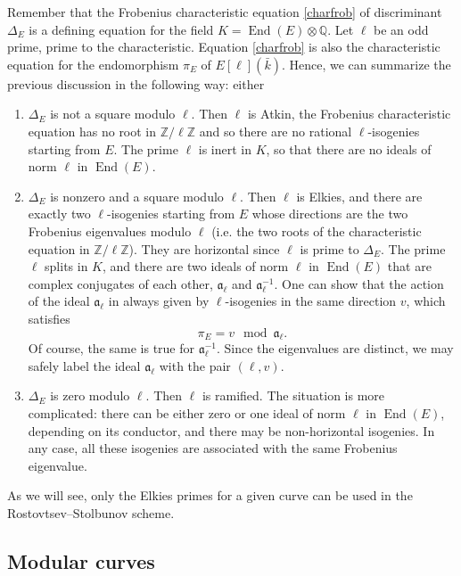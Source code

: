 \documentclass{article}
\newcommand{\Q}{\mathbb{Q}}
\newcommand{\Z}{\mathbb{Z}}
\renewcommand{\frak}{\mathfrak}
\theoremstyle{definition}
\DeclareMathOperator{\End}{End}
\begin{document}
Remember that the Frobenius characteristic equation \eqref{charfrob}
of discriminant $\Delta_E$ is a defining equation for the field $K = \End(E)
\otimes\Q$. 
Let $\ell$ be an odd prime, prime to the characteristic.
Equation \eqref{charfrob} is also the characteristic
equation for the endomorphism $\pi_E$ of $E[\ell](\bar{k})$.
Hence, we can summarize the previous discussion 
in the following way: either
\begin{enumerate}
\item $\Delta_E$ is not a square modulo $\ell$. Then $\ell$ is Atkin, the Frobenius
characteristic equation has no root in $\Z/\ell\Z$ and so there 
are no rational $\ell$-isogenies starting from $E$. The prime $\ell$ is inert 
in $K$, so that there are no ideals of norm $\ell$ in $\End(E)$.
\item $\Delta_E$ is nonzero and a square modulo $\ell$. Then $\ell$ is Elkies, 
and there are exactly two $\ell$-isogenies starting from $E$ whose directions 
are the two Frobenius eigenvalues modulo $\ell$ (i.e. the two roots of the
characteristic equation in $\Z/\ell\Z$). They are horizontal since $\ell
$ is prime to $\Delta_E$. The prime $\ell$ splits in $K$, and there are two 
ideals of norm $\ell$ in $\End(E)$ that are complex conjugates of each other, $
\frak a_\ell$ and $\frak a_\ell^{-1}$. One can show that the action of the 
ideal $\frak a_\ell$ in always given by $\ell$-isogenies in the same direction $
v$, which satisfies
\[
\pi_E = v \mod \frak a_\ell.
\]
Of course, the same is true for $\frak a_\ell^{-1}$. Since the eigenvalues are 
distinct, we may safely label the ideal $\frak a_\ell$ with the pair $(\ell, 
v)$.
\item $\Delta_E$ is zero modulo $\ell$. Then $\ell$ is ramified. The situation 
is more complicated: there can be either zero or one ideal of norm $\ell$ in $
\End(E)$, depending on its conductor, and there may be non-horizontal 
isogenies. In any case, all these isogenies are associated with the same 
Frobenius eigenvalue.

\end{enumerate}

As we will see, only the Elkies primes for a given curve can be used in the
Rostovtsev--Stolbunov scheme.

\subsection{Modular curves}
\end{document}
